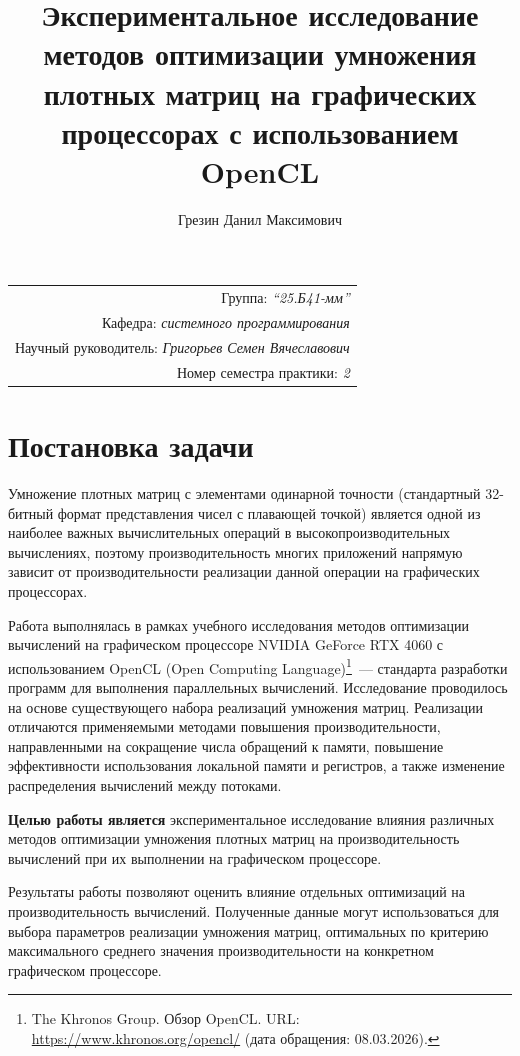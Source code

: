 \documentclass[a4paper]{article}
\title{Экспериментальное исследование методов оптимизации умножения плотных матриц на графических процессорах с использованием OpenCL}
\author{Грезин Данил Максимович}
\date{}
\begin{document}
\maketitle
\begin{flushright}
\begin{tabular}{r}
    Группа: \emph{\enquote{25.Б41-мм}} \\
    Кафедра: \emph{системного программирования} \\
    Научный руководитель: \emph{Григорьев Семен Вячеславович} \\
    Номер семестра практики: \emph{2} \\
\end{tabular}
\end{flushright}

\section{Постановка задачи}

Умножение плотных матриц с элементами одинарной точности (стандартный 32-битный формат представления чисел с плавающей точкой) является одной из наиболее важных вычислительных операций в высокопроизводительных вычислениях, поэтому производительность многих приложений напрямую зависит от производительности реализации данной операции на графических процессорах.

Работа выполнялась в рамках учебного исследования методов оптимизации вычислений на графическом процессоре NVIDIA GeForce RTX 4060 с использованием OpenCL (Open Computing Language)\footnote{The Khronos Group. Обзор OpenCL. URL: \url{https://www.khronos.org/opencl/} (дата обращения: 08.03.2026).}~--- стандарта разработки программ для выполнения параллельных вычислений. Исследование проводилось на основе существующего набора реализаций умножения матриц. Реализации отличаются применяемыми методами повышения производительности, направленными на сокращение числа обращений к памяти, повышение эффективности использования локальной памяти и регистров, а также изменение распределения вычислений между потоками.

\textbf{Целью работы является} экспериментальное исследование влияния различных методов оптимизации умножения плотных матриц на производительность вычислений при их выполнении на графическом процессоре.

Результаты работы позволяют оценить влияние отдельных оптимизаций на производительность вычислений. Полученные данные могут использоваться для выбора параметров реализации умножения матриц, оптимальных по критерию максимального среднего значения производительности на конкретном графическом процессоре.
\end{document}

